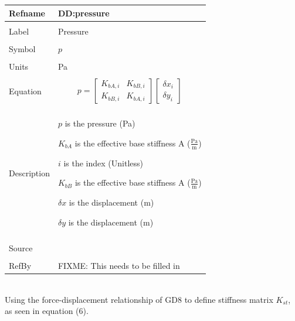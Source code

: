 \documentclass[12pt]{article}
\begin{document}
\noindent \begin{minipage}{\textwidth}
\begin{tabular}{p{} p{}}
\toprule \textbf{Refname} & \textbf{DD:pressure}
\label{DD:pressure}
\\ \midrule \\
Label & Pressure
\\ \midrule \\
Symbol & $p$
\\ \midrule \\
Units & Pa
\\ \midrule \\
Equation & \begin{dmath}
           p=\begin{bmatrix}
{K_{bA,i}} & {K_{bB,i}}\\
{K_{bB,i}} & {K_{bA,i}}
\end{bmatrix} \begin{bmatrix}
{δx}_{i}\\
{δy}_{i}
\end{bmatrix}
           \end{dmath}
\\ \midrule \\
Description & \begin{symbDescription}
              \item{$p$ is the pressure (Pa)}
              \item{${K_{bA}}$ is the effective base stiffness A ($\frac{\text{Pa}}{\text{m}}$)}
              \item{$i$ is the index (Unitless)}
              \item{${K_{bB}}$ is the effective base stiffness A ($\frac{\text{Pa}}{\text{m}}$)}
              \item{$δx$ is the displacement (m)}
              \item{$δy$ is the displacement (m)}
              \end{symbDescription}
\\ \midrule \\
Source & 
\\ \midrule \\
RefBy & FIXME: This needs to be filled in
\\ \bottomrule \end{tabular}
\end{minipage}\\
Using the force-displacement relationship of GD8 to define stiffness matrix ${K_{st}}$, as seen in equation (6).
\end{document}
